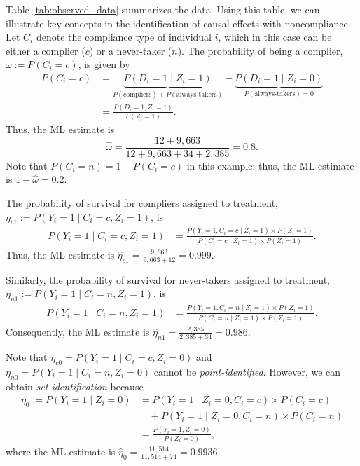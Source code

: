 Table \ref{tab:observed_data} summarizes the data. Using this table, we can illustrate key concepts in the identification of causal effects with noncompliance. Let $C_i$ denote the compliance type of individual $i$, which in this case can be either a complier ($c$) or a never-taker ($n$). The probability of being a complier, $\omega := P(C_i = c)$, is given by
\begin{align*}
	P(C_i = c) 
	&= \underbrace{P(D_i = 1 \mid Z_i = 1)}_{P(\text{compliers}) + P(\text{always-takers})} 
	- \underbrace{P(D_i = 1 \mid Z_i = 0)}_{P(\text{always-takers}) = 0} \\
	&= \frac{P(D_i = 1, Z_i = 1)}{P(Z_i = 1)}.
\end{align*}
Thus, the ML estimate is
\[
\hat{\omega} = \frac{12 + 9{,}663}{12 + 9{,}663 + 34 + 2{,}385}= 0.8.
\]
Note that $P(C_i = n) = 1 - P(C_i = c)$ in this example; thus, the ML estimate is $1-\hat{\omega} = 0.2$.

The probability of survival for compliers assigned to treatment, $\eta_{c1} := P(Y_i = 1 \mid C_i = c, Z_i = 1)$, is
\begin{align*}
	P(Y_i = 1 \mid C_i = c, Z_i = 1) 
	&= \frac{P(Y_i = 1, C_i = c \mid Z_i = 1) \times P(Z_i = 1)}{P(C_i = c \mid Z_i = 1) \times P(Z_i = 1)}.
\end{align*}
Thus, the ML estimate is $\hat{\eta}_{c1}= \frac{9{,}663}{9{,}663 + 12}= 0.999.$

Similarly, the probability of survival for never-takers assigned to treatment, $\eta_{n1} := P(Y_i = 1 \mid C_i = n, Z_i = 1)$, is
\begin{align*}
	P(Y_i = 1 \mid C_i = n, Z_i = 1) 
	&= \frac{P(Y_i = 1, C_i = n \mid Z_i = 1) \times P(Z_i = 1)}{P(C_i = n \mid Z_i = 1) \times P(Z_i = 1)}.
\end{align*}
Consequently, the ML estimate is $\hat{\eta}_{n1} = \frac{2{,}385}{2{,}385 + 34} = 0.986.$

Note that $\eta_{c0} = P(Y_i = 1 \mid C_i = c, Z_i = 0)$ and $\eta_{n0} = P(Y_i = 1 \mid C_i = n, Z_i = 0)$ cannot be \textit{point-identified}. However, we can obtain \emph{set identification} because
\begin{align*}
	\eta_0:=P(Y_i = 1 \mid Z_i = 0) 
	&= P(Y_i = 1 \mid Z_i = 0, C_i = c) \times P(C_i = c) \\
	&\quad + P(Y_i = 1 \mid Z_i = 0, C_i = n) \times P(C_i = n) \\
	&= \frac{P(Y_i = 1, Z_i = 0)}{P(Z_i = 0)},
\end{align*} where the ML estimate is $\hat{\eta}_0= \frac{11{,}514}{11{,}514 + 74}= 0.9936.$

